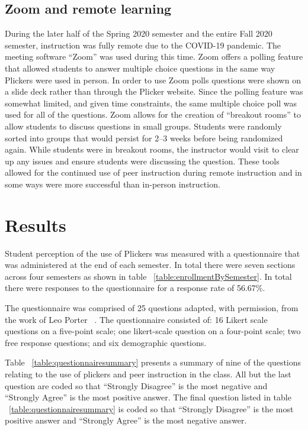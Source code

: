\documentclass{article}
\begin{document}
\subsection{Zoom and remote learning}
During the later half of the Spring 2020 semester and the entire Fall 2020 semester, instruction was fully remote due to the COVID-19 pandemic. The meeting software ``Zoom''  was used during this time. Zoom offers a polling feature that allowed students to answer multiple choice questions in the same way Plickers were used in person. In order to use Zoom polls questions were shown on a slide deck rather than through the Plicker website. Since the polling feature was somewhat limited, and given time constraints, the same multiple choice poll was used for all of the questions. 
Zoom allows for the creation of ``breakout rooms'' to allow students to discuss questions in small groups. Students were randomly sorted into groups that would persist for 2–3 weeks before being randomized again. While students were in breakout rooms, the instructor would visit to clear up any issues and ensure students were discussing the question. These tools allowed for the continued use of peer instruction during remote instruction and in some ways were more successful than in-person instruction.

\section{Results}

Student perception of the use of Plickers was measured with a questionnaire that was administered at the end of each semester. In total there were seven sections across four semesters as shown in table ~\ref{table:enrollmentBySemester}. In total there were \n responses to the questionnaire for a response rate of 56.67\%.

The questionnaire was comprised of 25 questions adapted, with permission, from the work of Leo Porter ~\cite{porterPeerInstructionStudents2011}. The questionnaire consisted of: 16 Likert scale questions on a five-point scale; one likert-scale question on a four-point scale;  two free response questions; and six demographic questions. 

Table ~\ref{table:questionnairesummary} presents a summary of nine of the questions relating to the use of plickers and peer instruction in the class. All but the last question are coded so that ``Strongly Disagree'' is the most negative and ``Strongly Agree'' is the most positive answer. The final question listed in table ~\ref{table:questionnairesummary} is coded so that ``Strongly Disagree'' is the most positive answer and ``Strongly Agree'' is the most negative answer. 
\end{document}
